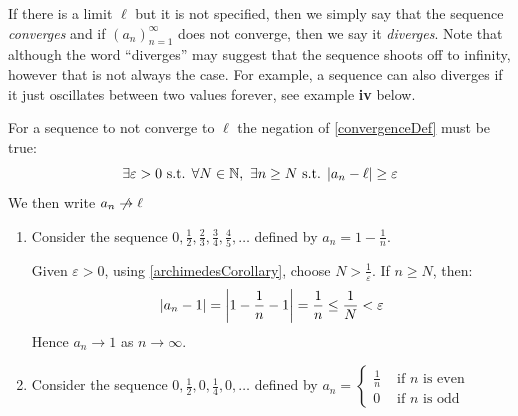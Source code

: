 \documentclass[../main.tex]{subfiles}
\begin{document}
If there is a limit $\ell$ but it is not specified, then we simply say that the sequence \textit{converges} and if $(a_n)^{\infty}_{n = 1}$ does not converge, then we say it \textit{diverges}.
Note that although the word ``diverges'' may suggest that the sequence shoots off to infinity, however that is not always the case.
For example, a sequence can also diverges if it just oscillates between two values forever, see example \textbf{iv} below.
\begin{remark}
  For a sequence to not converge to $\ell$ the negation of \cref{convergenceDef} must be true:
  \[
    \exists \varepsilon > 0 \text{ s.t. } \forall N \in \mathbb{N},\ \exists n \geq N \text{ s.t. } |a_n - \ell| \geq \varepsilon
  \]
  We then write $a_n \centernot \to \ell$
\end{remark}
\begin{example}
  \begin{enumerate}
    \item Consider the sequence $0, \frac{1}{2}, \frac{2}{3}, \frac{3}{4}, \frac{4}{5}, \ldots$ defined by $a_n = 1 - \frac{1}{n}$.
      \begin{center}
      \end{center}
      Given $\varepsilon > 0$, using \cref{archimedesCorollary}, choose $N > \frac{1}{\varepsilon}$.
      If $n \geq N$, then:
      \[
        |a_n - 1| = \left\lvert 1 - \frac{1}{n} - 1 \right\rvert = \frac{1}{n} \leq \frac{1}{N} < \varepsilon
      \]
      Hence $a_n \to 1$ as $n \to \infty$.
    \item Consider the sequence $0, \frac{1}{2}, 0, \frac{1}{4}, 0, \ldots$ defined by
      $a_n = \begin{cases}
      \frac{1}{n} & \text{ if $n$ is even} \\
      0 & \text{ if $n$ is odd}
      \end{cases}$
    \begin{center}

\end{center}
\end{enumerate}
\end{example}
\end{document}
